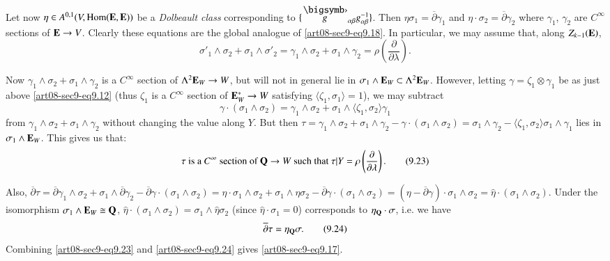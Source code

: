 Let now $\eta\in A^{0,1}(V,\operatorname{\mathrm{Hom}}(\mathbf{E},\mathbf{E}))$ be a {\em Dolbeault class} corresponding to $\{\overdot{g}_{\alpha\beta}g^{-1}_{\alpha\beta}\}$. Then $\eta\sigma_{1}=\overline{\partial}\gamma_{1}$ and $\eta\cdot \sigma_{2}=\overline{\partial}\gamma_{2}$ where $\gamma_{1}$, $\gamma_{2}$ are $C^{\infty}$ sections of $\mathbf{E}\to V$. Clearly these equations are the global analogue of \eqref{art08-sec9-eq9.18}. In particular, we may assume that, along $Z_{k-1}(\mathbf{E})$,
\begin{equation*}
\sigma'_{1}\wedge \sigma_{2}+\sigma_{1}\wedge \sigma'_{2}=\gamma_{1}\wedge \sigma_{2}+\sigma_{1}\wedge \gamma_{2}=\rho\left(\dfrac{\partial}{\partial\lambda}\right).\tag{9.22}\label{art08-sec9-eq9.22}
\end{equation*}\pageoriginale

Now $\gamma_{1}\wedge \sigma_{2}+\sigma_{1}\wedge\gamma_{2}$ is a $C^{\infty}$ section of $\Lambda^{2}\mathbf{E}_{W}\to W$, but will not in general lie in $\sigma_{1}\wedge \mathbf{E}_{W}\subset \Lambda^{2}\mathbf{E}_{W}$. However, letting $\gamma=\zeta_{1}\otimes \gamma_{1}$ be as just above \eqref{art08-sec9-eq9.12} (thus $\zeta_{1}$ is a $C^{\infty}$ section of $\mathbf{E}^{*}_{W}\to W$ satisfying $\langle\zeta_{1},\sigma_{1}\rangle=1$), we may subtract
$$
\gamma\cdot (\sigma_{1}\wedge\sigma_{2})=\gamma_{1}\wedge\sigma_{2}+\sigma_{1}\wedge\langle \zeta_{1},\sigma_{2}\rangle \gamma_{1}
$$
from $\gamma_{1}\wedge\sigma_{2}+\sigma_{1}\wedge\gamma_{2}$ without changing the value along $Y$. But then $\tau=\gamma_{1}\wedge\sigma_{2}+\sigma_{1}\wedge\gamma_{2}-\gamma\cdot (\sigma_{1}\wedge\sigma_{2})=\sigma_{1}\wedge\gamma_{2}-\langle \zeta_{1},\sigma_{2}\rangle\sigma_{1}\wedge\gamma_{1}$ lies in $\sigma_{1}\wedge \mathbf{E}_{W}$. This gives us that:
\begin{equation*}
\tau\text{ is a $C^{\infty}$ section of } \mathbf{Q}\to W\text{ such that } \tau|Y=\rho\left(\frac{\partial}{\partial\lambda}\right).\tag{9.23}\label{art08-sec9-eq9.23}
\end{equation*}

Also, $\overline{\partial}\tau=\overline{\partial}\gamma_{1}\wedge \sigma_{2}+\sigma_{1}\wedge\overline{\partial}\gamma_{2}-\overline{\partial}\gamma\cdot (\sigma_{1}\wedge\sigma_{2})= \eta\cdot \sigma_{1}\wedge\sigma_{2}+\sigma_{1}\wedge\eta\sigma_{2}-\overline{\partial}\gamma\cdot (\sigma_{1}\wedge\sigma_{2})=(\eta-\overline{\partial}\gamma)\cdot \sigma_{1}\wedge\sigma_{2}=\widehat{\eta}\cdot (\sigma_{1}\wedge\sigma_{2})$. Under the isomorphism $\sigma_{1}\wedge\mathbf{E}_{W}\cong \mathbf{Q}$, $\widehat{\eta}\cdot (\sigma_{1}\wedge\sigma_{2})=\sigma_{1}\wedge\widehat{\eta}\sigma_{2}$ (since $\widehat{\eta}\cdot \sigma_{1}=0$) corresponds to $\eta_{\mathbf{Q}}\cdot \sigma$, i.e. we have
\begin{equation*}
\overline{\partial}\tau=\eta_{\mathbf{Q}}\sigma.\tag{9.24}\label{art08-sec9-eq9.24}
\end{equation*}
Combining \eqref{art08-sec9-eq9.23} and \eqref{art08-sec9-eq9.24} gives \eqref{art08-sec9-eq9.17}.


